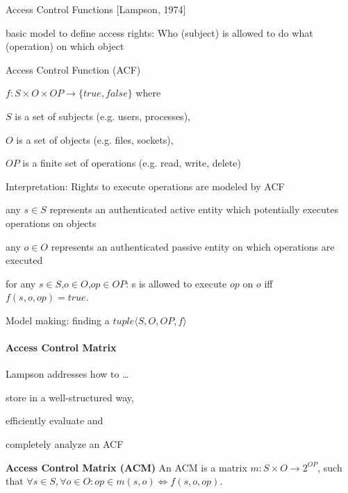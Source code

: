 \documentclass[a4paper]{article}
\renewcommand{\note}[2]{\begin{noteBox} \textbf{#1} #2 \end{noteBox}}
\begin{document}
\begin{multicols}{3}
    Access Control Functions [Lampson, 1974]
    \begin{itemize*}
        \item basic model to define access rights: Who (subject) is allowed to do what (operation) on which object
        \item Access Control Function (ACF)
        \begin{itemize*}
            \item $f:S \times O \times OP \rightarrow \{true,false\}$ where
            \item $S$ is a set of subjects (e.g. users, processes),
            \item $O$ is a set of objects (e.g. files, sockets),
            \item $OP$ is a finite set of operations (e.g. read, write, delete)
        \end{itemize*}
        \item Interpretation: Rights to execute operations are modeled by ACF
        \begin{itemize*}
            \item any $s\in S$ represents an authenticated active entity which potentially executes operations on objects
            \item any $o\in O$ represents an authenticated passive entity on which operations are executed
            \item for any $s\in S$,$o\in O$,$op\in OP$: s is allowed to execute $op$ on $o$ iff $f(s,o,op)=true$.
            \item Model making: finding a $tuple\langle S,O,OP,f\rangle$
        \end{itemize*}
    \end{itemize*}

    \paragraph{Access Control Matrix}
    Lampson addresses how to \dots
    \begin{itemize*}
        \item store in a well-structured way,
        \item efficiently evaluate and
        \item completely analyze an ACF
    \end{itemize*}

    \note{Access Control Matrix (ACM)}{An ACM is a matrix $m:S\times O \rightarrow 2^{OP}$, such that $\forall s\in S,\forall o\in O:op\in m(s,o)\Leftrightarrow f(s,o,op)$.}


\end{multicols}
\end{document}
